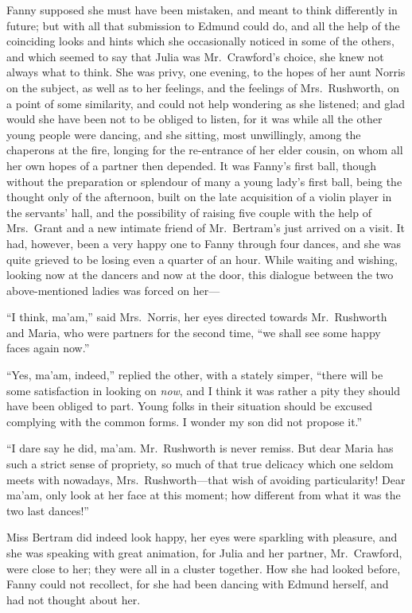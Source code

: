 Fanny supposed she must have been mistaken, and meant to
think differently in future; but with all that submission
to Edmund could do, and all the help of the coinciding
looks and hints which she occasionally noticed in some
of the others, and which seemed to say that Julia was
Mr.\ Crawford's choice, she knew not always what to think.
She was privy, one evening, to the hopes of her aunt
Norris on the subject, as well as to her feelings,
and the feelings of Mrs.\ Rushworth, on a point of some
similarity, and could not help wondering as she listened;
and glad would she have been not to be obliged to listen,
for it was while all the other young people were dancing,
and she sitting, most unwillingly, among the chaperons at
the fire, longing for the re-entrance of her elder cousin,
on whom all her own hopes of a partner then depended.
It was Fanny's first ball, though without the preparation
or splendour of many a young lady's first ball, being the
thought only of the afternoon, built on the late acquisition
of a violin player in the servants' hall, and the possibility
of raising five couple with the help of Mrs.\ Grant and a new
intimate friend of Mr.\ Bertram's just arrived on a visit.
It had, however, been a very happy one to Fanny through
four dances, and she was quite grieved to be losing
even a quarter of an hour.  While waiting and wishing,
looking now at the dancers and now at the door, this dialogue
between the two above-mentioned ladies was forced on her---%

``I think, ma'am,'' said Mrs.\ Norris, her eyes directed
towards Mr.\ Rushworth and Maria, who were partners for
the second time, ``we shall see some happy faces again now.''

``Yes, ma'am, indeed,'' replied the other, with a stately simper,
``there will be some satisfaction in looking on \emph{now},
and I think it was rather a pity they should have been
obliged to part.  Young folks in their situation
should be excused complying with the common forms.
I wonder my son did not propose it.''

``I dare say he did, ma'am. Mr.\ Rushworth is never remiss.
But dear Maria has such a strict sense of propriety, so much
of that true delicacy which one seldom meets with nowadays,
Mrs.\ Rushworth---that wish of avoiding particularity!
Dear ma'am, only look at her face at this moment;
how different from what it was the two last dances!''

Miss Bertram did indeed look happy, her eyes were
sparkling with pleasure, and she was speaking with
great animation, for Julia and her partner, Mr.\ Crawford,
were close to her; they were all in a cluster together.
How she had looked before, Fanny could not recollect,
for she had been dancing with Edmund herself, and had
not thought about her.

